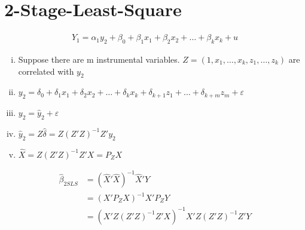 \documentclass[11pt]{article}
\begin{document}
\section{2-Stage-Least-Square}
\begin{align}
Y_1=\alpha_1 y_2 + \beta_0 + \beta_1 x_1 + \beta_2 x_2 + \dots + \beta_k x_k +u
\end{align}
\begin{enumerate}[(i)]
\item Suppose there are m instrumental variables. $Z=(1,x_1,\dots,x_k,z_1,\dots,z_k)$ are correlated with $y_2$
\item $y_2 = \delta_0 + \delta_1 x_1 + \delta_2 x_2 + \dots + \delta_k x_k + \delta_{k+1} z_1 + \dots + \delta_{k+m} z_m + \varepsilon$
\item $y_2= \hat{y}_2 + \varepsilon$
\item $\hat{y}_2 = Z\hat{\delta} = Z(Z'Z)^{-1}Z'y_2$
\item $\hat{X} = Z(Z'Z)^{-1}Z'X = P_Z X$
\end{enumerate}

\begin{align}
\hat{\beta}_{2SLS} &= (\hat{X}'\hat{X})^{-1}\hat{X}'Y \nonumber \\
&= (X'P_Z X)^{-1}X'P_Z Y \nonumber \\
&= (X'Z(Z'Z)^{-1}Z'X)^{-1}X'Z(Z'Z)^{-1}Z'Y
\end{align}
\end{document}
